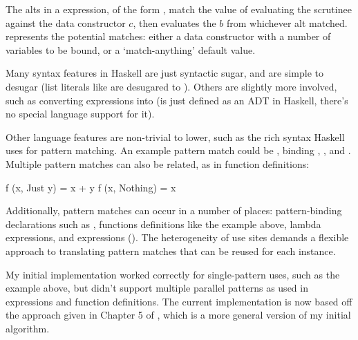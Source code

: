 \documentclass[dissertation.tex]{subfiles}
\begin{document}
{{{            
            
            The alts in a  expression, of the form , match the value of
            evaluating the scrutinee against the data constructor \(c\), then evaluates the \(b\) from whichever alt
            matched.  represents the potential matches: either a data constructor with a
            number of variables to be bound, or a `match-anything' default value.


            Many syntax features in Haskell are just syntactic sugar, and are simple to desugar (list literals like
            \haskell{[1, 2]} are desugared to ). Others are slightly more involved, such as converting
             expressions into 
            (is just defined as an ADT in Haskell, there's no special language support for it).

            Other language features are non-trivial to lower, such as the rich syntax Haskell uses for pattern matching.
            An example pattern match could be , binding ,
            , and . Multiple pattern matches can also be related, as in function
            definitions:

            \begin{haskellfigure}
            f (x, Just y) = x + y
            f (x, Nothing) = x
            \end{haskellfigure}

            Additionally, pattern matches can occur in a number of places: pattern-binding declarations such as
            , functions definitions like the example above, lambda expressions, and
             expressions (). The heterogeneity
            of use sites demands a flexible approach to translating pattern matches that can be reused for each
            instance.

            My initial implementation worked correctly for single-pattern uses, such as the  example above,
            but didn't support multiple parallel patterns as used in  expressions and function
            definitions. The current implementation is now based off the approach given in Chapter 5 of
            \cite{ImplFunLang}, which is a more general version of my initial algorithm.

}}}
\end{document}
